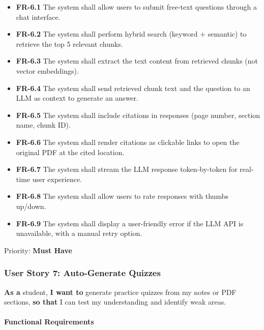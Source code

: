 \documentclass[12pt,a4paper]{article}
\begin{document}
\begin{itemize}
    \item \textbf{FR-6.1} The system shall allow users to submit free-text questions through a chat interface.
    \item \textbf{FR-6.2} The system shall perform hybrid search (keyword + semantic) to retrieve the top 5 relevant chunks.
    \item \textbf{FR-6.3} The system shall extract the text content from retrieved chunks (not vector embeddings).
    \item \textbf{FR-6.4} The system shall send retrieved chunk text and the question to an LLM as context to generate an answer.
    \item \textbf{FR-6.5} The system shall include citations in responses (page number, section name, chunk ID).
    \item \textbf{FR-6.6} The system shall render citations as clickable links to open the original PDF at the cited location.
    \item \textbf{FR-6.7} The system shall stream the LLM response token-by-token for real-time user experience.
    \item \textbf{FR-6.8} The system shall allow users to rate responses with thumbs up/down.
    \item \textbf{FR-6.9} The system shall display a user-friendly error if the LLM API is unavailable, with a manual retry option.
\end{itemize}

Priority: \textbf{Must Have}

\subsubsection{User Story 7: Auto-Generate Quizzes}

\textbf{As a} student, \textbf{I want to} generate practice quizzes from my notes or PDF sections, \textbf{so that} I can test my understanding and identify weak areas.

\paragraph{Functional Requirements}
\end{document}
